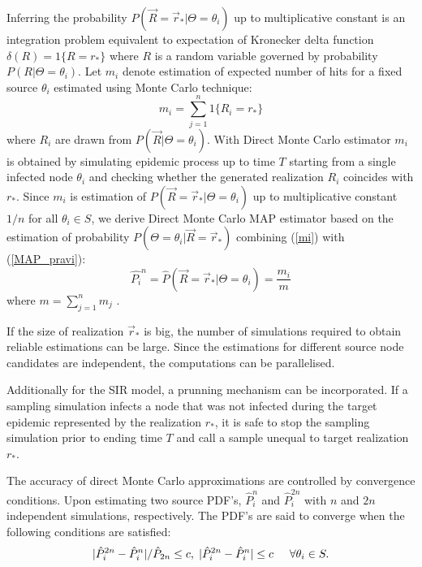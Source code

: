 \documentclass[times, utf8, diplomski]{fer}
\begin{document}
Inferring the probability  $P(\vec R = \vec r_* | \Theta = \theta_i)$ up to multiplicative constant is an integration problem equivalent to expectation of Kronecker delta function
 $\delta(R) = 1\{R = r_{*}\}$ where $R$ is a random variable governed by probability $P(R  | \Theta = \theta_i)$. 
 Let $m_i$ denote estimation of expected number of hits for a fixed source $\theta_i$ estimated using Monte Carlo technique:
\begin{equation}
 m_i = \sum_{j = 1}^{n} 1\{R_i = r_{*}\}
\label{mi}
\end{equation}
where $R_i$ are drawn from $P(\vec R | \Theta = \theta_i)$. With Direct Monte Carlo estimator $m_i$ is obtained by simulating epidemic process up to time $T$ starting from a single infected node $\theta_i$ and checking whether the generated realization $R_i$ coincides with $r_*$. Since $m_i$ is estimation of $P(\vec R = \vec r_* | \Theta = \theta_i)$ up to multiplicative constant $1/n$ for all $\theta_i \in S$, we derive Direct Monte Carlo MAP estimator based on the estimation of probability $P(\Theta = \theta_i | \vec R = \vec r_*)$ combining (\ref{mi}) with (\ref{MAP_pravi}): 
\begin{equation}
\hat{P_i}^n = \hat{P}(\vec R = \vec r_* | \Theta = \theta_i) = \frac{m_i}{m}
\end{equation}
where $m = \sum_{j = 1}^{n} m_j$ .

If the size of realization $\vec r_*$ is big, the number of simulations required to obtain reliable estimations can be large. Since the estimations for different source node candidates are independent, the computations can be parallelised.  

Additionally for the SIR model, a prunning mechanism can be incorporated. If a sampling simulation infects a node that was not infected during the target epidemic  represented by the realization $r_*$, it is safe to stop the sampling simulation prior to ending time $T$ and call a sample unequal to target realization $r_*$.

The accuracy of direct Monte Carlo approximations are controlled by convergence conditions. Upon estimating two source PDF's, $\hat{P}_i^n$ and $\hat{P}_i^{2n}$ with $n$ and $2n$ independent simulations, respectively. The PDF's are said to converge when the following conditions are satisfied:
\begin{equation}
| \hat{P}_i^{2n} - \hat{P}_i^{n} | / \hat{P}_{2n} \leq c, \hspace{1mm} | \hat{P}_i^{2n} - \hat{P}_i^{n} | \leq c \hspace{5mm} \forall \theta_i \in S.
\end{equation}
\end{document}
